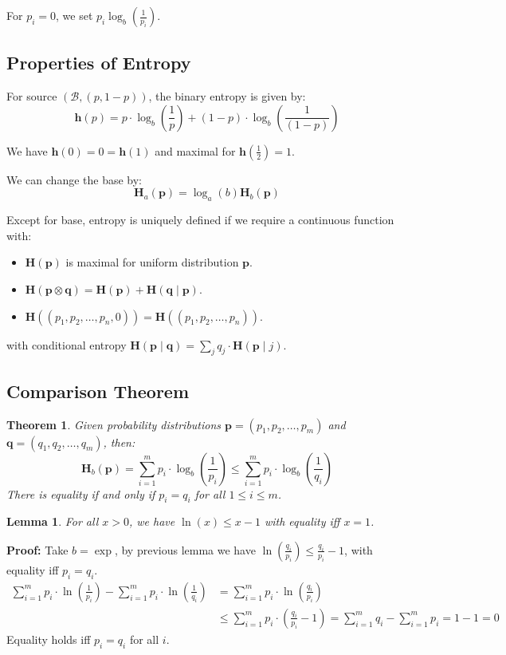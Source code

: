 \documentclass[11pt]{article}
\newtheorem{theo}{Theorem}
\newtheorem{lem}{Lemma}
\begin{document}
For $p_i = 0$, we set $p_i \log_b (\frac{1}{p_i})$.

\subsection{Properties of Entropy}
For source $(\mathcal{B}, (p, 1 - p))$, the binary entropy is given by:
\[
  \textbf{h}(p) = p \cdot \log_b (\frac{1}{p}) + (1 - p) \cdot \log_b (\frac{1}{(1 - p)})
\]

We have $\textbf{h}(0) = 0 = \textbf{h}(1)$ and maximal for $\textbf{h}(\frac{1}{2}) = 1$.

We can change the base by:
\[
  \textbf{H}_a(\textbf{p}) = \log_a(b) \textbf{H}_b(\textbf{p})
\]

Except for base, entropy is uniquely defined if we require a continuous function with:
\begin{itemize}
  \item $\textbf{H}(\textbf{p})$ is maximal for uniform distribution $\textbf{p}$.
  \item $\textbf{H}(\textbf{p} \otimes \textbf{q}) = \textbf{H}(\textbf{p}) + \textbf{H}(\textbf{q} \mid \textbf{p})$.
  \item $\textbf{H}((p_1, p_2, \ldots, p_n, 0)) = \textbf{H}((p_1, p_2, \ldots, p_n))$.
\end{itemize}

with conditional entropy $\textbf{H}(\textbf{p} \mid \textbf{q}) = \sum_jq_j \cdot \textbf{H}(\textbf{p} \mid j)$.

\subsection{Comparison Theorem}
\begin{theo}
  Given probability distributions $\textbf{p} = (p_1, p_2, \ldots, p_m)$ and $\textbf{q} = (q_1, q_2, \ldots, q_m)$, then:
  \[
    \textbf{H}_b(\textbf{p}) = \sum_{i = 1}^m p_i \cdot \log_b (\frac{1}{p_i}) \leq \sum_{i = 1}^m p_i \cdot \log_b (\frac{1}{q_i}) 
  \]
  There is equality if and only if $p_i = q_i$ for all $1 \leq i \leq m$.
\end{theo}

\begin{lem}
For all $x > 0$, we have $\ln(x) \leq x - 1$ with equality iff $x = 1$.
\end{lem}

\textbf{Proof:}
Take $b = \exp$, by previous lemma we have $\ln(\frac{q_i}{p_i}) \leq \frac{q_i}{p_i} - 1$, with equality iff $p_i = q_i$.
\begin{align*}
  \sum_{i = 1}^m p_i \cdot \ln(\frac{1}{p_i}) - \sum_{i = 1}^m p_i \cdot \ln({\frac{1}{q_i}}) &= \sum_{i = 1}^m p_i \cdot \ln(\frac{q_i}{p_i}) \\
  & \leq \sum_{i = 1}^m p_i \cdot (\frac{q_i}{p_i} - 1) = \sum_{i = 1}^m q_i - \sum_{i = 1}^m p_i = 1 - 1 = 0
\end{align*}
Equality holds iff $p_i = q_i$ for all $i$.
\end{document}
